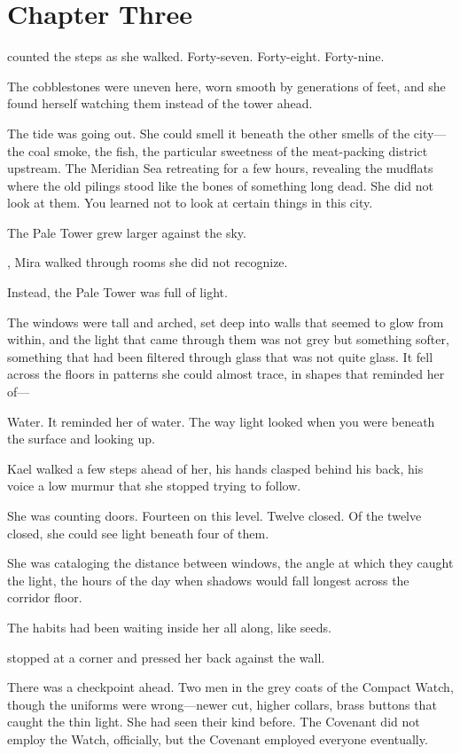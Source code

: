 \documentclass[12pt,letterpaper,openany]{book}
\begin{document}
\chapter{Chapter Three}
\hrulefillVera counted the steps as she walked. Forty-seven. Forty-eight. Forty-nine.
\par
The cobblestones were uneven here, worn smooth by generations of feet, and she found herself watching them instead of the tower ahead.
\par
The tide was going out. She could smell it beneath the other smells of the city—the coal smoke, the fish, the particular sweetness of the meat-packing district upstream. The Meridian Sea retreating for a few hours, revealing the mudflats where the old pilings stood like the bones of something long dead. She did not look at them. You learned not to look at certain things in this city.
\par
The Pale Tower grew larger against the sky.
\par
\hrulefillInside, Mira walked through rooms she did not recognize.
\par
Instead, the Pale Tower was full of light.
\par
The windows were tall and arched, set deep into walls that seemed to glow from within, and the light that came through them was not grey but something softer, something that had been filtered through glass that was not quite glass. It fell across the floors in patterns she could almost trace, in shapes that reminded her of—
\par
Water. It reminded her of water. The way light looked when you were beneath the surface and looking up.
\par
Kael walked a few steps ahead of her, his hands clasped behind his back, his voice a low murmur that she stopped trying to follow.
\par
She was counting doors. Fourteen on this level. Twelve closed. Of the twelve closed, she could see light beneath four of them.
\par
She was cataloging the distance between windows, the angle at which they caught the light, the hours of the day when shadows would fall longest across the corridor floor.
\par
The habits had been waiting inside her all along, like seeds.
\par
\hrulefillVera stopped at a corner and pressed her back against the wall.
\par
There was a checkpoint ahead. Two men in the grey coats of the Compact Watch, though the uniforms were wrong—newer cut, higher collars, brass buttons that caught the thin light. She had seen their kind before. The Covenant did not employ the Watch, officially, but the Covenant employed everyone eventually.
\end{document}
